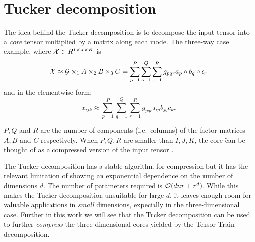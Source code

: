 \section{Tucker decomposition}
The idea behind the Tucker decomposition is to decompose the input tensor into a \emph{core} tensor multiplied by a matrix along each mode.
The three-way case example, where $\mathcal{X} \in R^{I \times J \times K}$ is:
\begin{equation*}
  \mathcal{X} \approx \mathcal{G} \times_1 A \times_2 B \times_3 C = \sum_{p=1}^P \sum_{q=1}^Q \sum_{r=1}^R g_{pqr} a_p \circ b_q \circ c_r
\end{equation*}
and in the elementwise form:
\begin{equation*}
  x_{ijk} \approx \sum_{p=1}^P \sum_{q=1}^Q \sum_{r=1}^R g_{pqr} a_{ip} b_{jq} c_{kr}
\end{equation*}

$P, Q$ and $R$ are the number of components (i.e.\ columns) of the factor matrices $A, B$ and $C$ respectively. When $P,Q,R$ are smaller than $I,J,K$, the core \G can be thought of as a compressed version of the input tensor \X.

The Tucker decomposition has a stable algorithm for compression but it has the relevant limitation of showing an exponential dependence on the number of dimensions $d$. The number of parameters required is $\mathcal{O}(dnr+r^d)$.
While this makes the Tucker decomposition unsuitable for large $d$, it leaves enough room for valuable applications in \emph{small} dimensions, expecially in the three-dimensional case. Further in this work we will see that the Tucker decomposition can be used to further \emph{compress} the three-dimensional cores yielded by the Tensor Train decomposition.
